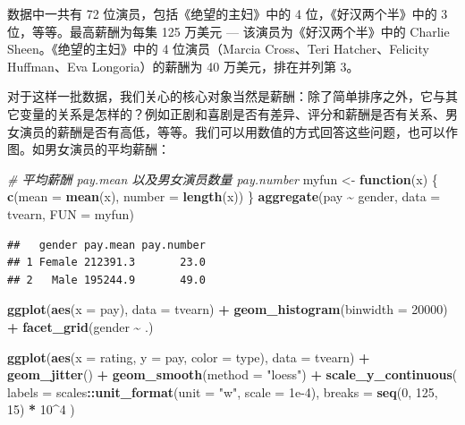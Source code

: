 \documentclass[
  b5paper,
  UTF8,twoside]{book}
\newenvironment{Shaded}{\begin{snugshade}}{\end{snugshade}}
\newcommand{\AttributeTok}[1]{\textcolor[rgb]{0.13,0.29,0.53}{#1}}
\newcommand{\CommentTok}[1]{\textcolor[rgb]{0.56,0.35,0.01}{\textit{#1}}}
\newcommand{\ControlFlowTok}[1]{\textcolor[rgb]{0.13,0.29,0.53}{\textbf{#1}}}
\newcommand{\DecValTok}[1]{\textcolor[rgb]{0.00,0.00,0.81}{#1}}
\newcommand{\FloatTok}[1]{\textcolor[rgb]{0.00,0.00,0.81}{#1}}
\newcommand{\FunctionTok}[1]{\textcolor[rgb]{0.13,0.29,0.53}{\textbf{#1}}}
\newcommand{\NormalTok}[1]{#1}
\newcommand{\OtherTok}[1]{\textcolor[rgb]{0.56,0.35,0.01}{#1}}
\newcommand{\SpecialCharTok}[1]{\textcolor[rgb]{0.81,0.36,0.00}{\textbf{#1}}}
\newcommand{\StringTok}[1]{\textcolor[rgb]{0.31,0.60,0.02}{#1}}
\begin{document}
数据中一共有 72 位演员，包括《绝望的主妇》中的 4 位，《好汉两个半》中的 3 位，等等。最高薪酬为每集 125 万美元 --- 该演员为《好汉两个半》中的 Charlie Sheen。《绝望的主妇》中的 4 位演员（Marcia Cross、Teri Hatcher、Felicity Huffman、Eva Longoria）的薪酬为 40 万美元，排在并列第 3。

对于这样一批数据，我们关心的核心对象当然是薪酬：除了简单排序之外，它与其它变量的关系是怎样的？例如正剧和喜剧是否有差异、评分和薪酬是否有关系、男女演员的薪酬是否有高低，等等。我们可以用数值的方式回答这些问题，也可以作图。如男女演员的平均薪酬：

\begin{Shaded}
\begin{Highlighting}[]
\CommentTok{\# 平均薪酬 pay.mean 以及男女演员数量 pay.number}
\NormalTok{myfun }\OtherTok{\textless{}{-}} \ControlFlowTok{function}\NormalTok{(x) \{}
 \FunctionTok{c}\NormalTok{(}\AttributeTok{mean =} \FunctionTok{mean}\NormalTok{(x), }\AttributeTok{number =} \FunctionTok{length}\NormalTok{(x))}
\NormalTok{\}}
\FunctionTok{aggregate}\NormalTok{(pay }\SpecialCharTok{\textasciitilde{}}\NormalTok{ gender, }\AttributeTok{data =}\NormalTok{ tvearn, }\AttributeTok{FUN =}\NormalTok{ myfun)}
\end{Highlighting}
\end{Shaded}

\begin{verbatim}
##   gender pay.mean pay.number
## 1 Female 212391.3       23.0
## 2   Male 195244.9       49.0
\end{verbatim}

\begin{Shaded}
\begin{Highlighting}[]
\FunctionTok{ggplot}\NormalTok{(}\FunctionTok{aes}\NormalTok{(}\AttributeTok{x =}\NormalTok{ pay), }\AttributeTok{data =}\NormalTok{ tvearn) }\SpecialCharTok{+}
  \FunctionTok{geom\_histogram}\NormalTok{(}\AttributeTok{binwidth =} \DecValTok{20000}\NormalTok{) }\SpecialCharTok{+}
  \FunctionTok{facet\_grid}\NormalTok{(gender }\SpecialCharTok{\textasciitilde{}}\NormalTok{ .)}

\FunctionTok{ggplot}\NormalTok{(}\FunctionTok{aes}\NormalTok{(}\AttributeTok{x =}\NormalTok{ rating, }\AttributeTok{y =}\NormalTok{ pay, }\AttributeTok{color =}\NormalTok{ type), }\AttributeTok{data =}\NormalTok{ tvearn) }\SpecialCharTok{+}
  \FunctionTok{geom\_jitter}\NormalTok{() }\SpecialCharTok{+}
  \FunctionTok{geom\_smooth}\NormalTok{(}\AttributeTok{method =} \StringTok{"loess"}\NormalTok{) }\SpecialCharTok{+}
  \FunctionTok{scale\_y\_continuous}\NormalTok{(}
    \AttributeTok{labels =}\NormalTok{ scales}\SpecialCharTok{::}\FunctionTok{unit\_format}\NormalTok{(}\AttributeTok{unit =} \StringTok{"w"}\NormalTok{, }\AttributeTok{scale =} \FloatTok{1e{-}4}\NormalTok{),}
    \AttributeTok{breaks =} \FunctionTok{seq}\NormalTok{(}\DecValTok{0}\NormalTok{, }\DecValTok{125}\NormalTok{, }\DecValTok{15}\NormalTok{) }\SpecialCharTok{*} \DecValTok{10}\SpecialCharTok{\^{}}\DecValTok{4}
\NormalTok{  )}
\end{Highlighting}
\end{Shaded}
\end{document}
